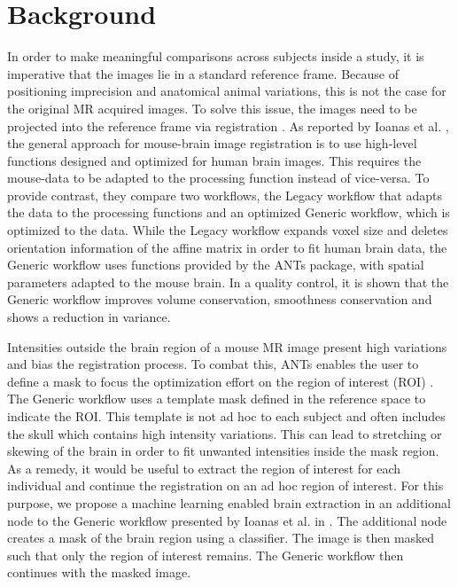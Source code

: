 \section{Background}
In order to make meaningful comparisons across subjects inside a study, it is imperative that the images lie in a standard reference frame.
Because of positioning imprecision and anatomical animal variations, this is not the case for the original MR acquired images.
To solve this issue, the images need to be projected into the reference frame via registration \cite{maintz_overview_nodate, sotiras_deformable_2013}.
As reported by Ioanas et al. \cite{ioanas_optimized_2019}, the general approach for mouse-brain image registration is to use high-level functions designed and optimized for human brain images.
This requires the mouse-data to be adapted to the processing function instead of vice-versa.
To provide contrast, they compare two workflows, the Legacy workflow that adapts the data to the processing functions and an optimized Generic workflow, which is optimized to the data.
While the Legacy workflow expands voxel size and deletes orientation information of the affine matrix in order to fit human brain data, the Generic workflow uses functions provided by the ANTs package, with spatial parameters adapted to the mouse brain.
In a quality control, it is shown that the Generic workflow improves volume conservation, smoothness conservation and shows a reduction in variance.

Intensities outside the brain region of a mouse MR image present high variations and bias the registration process.
To combat this, ANTs enables the user to define a mask to focus the optimization
effort on the region of interest (ROI) \cite{ants}.
The Generic workflow uses a template mask defined in the reference space to indicate the ROI.
This template is not ad hoc to each subject and often includes the skull which contains high intensity variations.
This can lead to stretching or skewing of the brain in order to fit unwanted intensities inside the mask region.
As a remedy, it would be useful to extract the region of interest for each individual and continue the registration on an ad hoc region of interest.
For this purpose, we propose a machine learning enabled brain extraction in an additional node to the Generic workflow presented by Ioanas et al. in \cite{ioanas_optimized_2019}.
The additional node creates a mask of the brain region using a classifier.
The image is then masked such that only the region of interest remains.
The Generic workflow then continues with the masked image.


